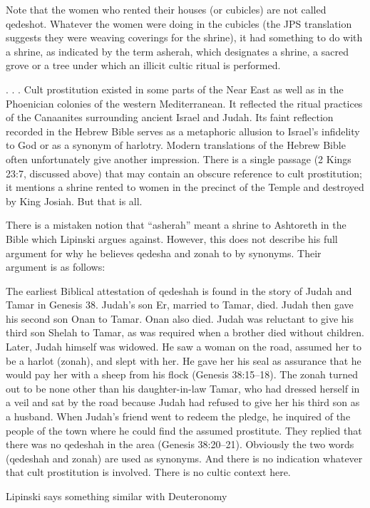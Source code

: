 \documentclass[11pt]{article}
\begin{document}
Note that the women who rented their houses (or cubicles) are not called qedeshot. Whatever the women were doing in the cubicles (the JPS translation suggests they were weaving coverings for the shrine), it had something to do with a shrine, as indicated by the term asherah, which designates a shrine, a sacred grove or a tree under which an illicit cultic ritual is performed.

. . . 
Cult prostitution existed in some parts of the Near East as well as in the Phoenician colonies of the western Mediterranean. It reflected the ritual practices of the Canaanites surrounding ancient Israel and Judah. Its faint reflection recorded in the Hebrew Bible serves as a metaphoric allusion to Israel’s infidelity to God or as a synonym of harlotry. Modern translations of the Hebrew Bible often unfortunately give another impression. There is a single passage (2 Kings 23:7, discussed above) that may contain an obscure reference to cult prostitution; it mentions a shrine rented to women in the precinct of the Temple and destroyed by King Josiah. But that is all.

There is a mistaken notion that “asherah” meant a shrine to Ashtoreth in the Bible which Lipinski argues against. However, this does not describe his full argument for why he believes qedesha and zonah to by synonyms. Their argument is as follows:

The earliest Biblical attestation of qedeshah is found in the story of Judah and Tamar in Genesis 38. Judah’s son Er, married to Tamar, died. Judah then gave his second son Onan to Tamar. Onan also died. Judah was reluctant to give his third son Shelah to Tamar, as was required when a brother died without children. Later, Judah himself was widowed. He saw a woman on the road, assumed her to be a harlot (zonah), and slept with her. He gave her his seal as assurance that he would pay her with a sheep from his flock (Genesis 38:15–18). The zonah turned out to be none other than his daughter-in-law Tamar, who had dressed herself in a veil and sat by the road because Judah had refused to give her his third son as a husband. When Judah’s friend went to redeem the pledge, he inquired of the people of the town where he could find the assumed prostitute. They replied that there was no qedeshah in the area (Genesis 38:20–21). Obviously the two words (qedeshah and zonah) are used as synonyms. And there is no indication whatever that cult prostitution is involved. There is no cultic context here.

Lipinski says something similar with Deuteronomy
\end{document}
